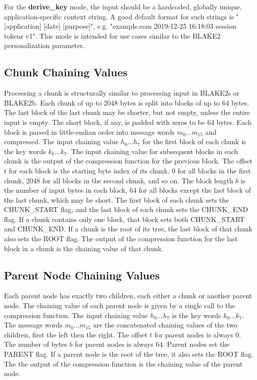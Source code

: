 \documentclass[11pt,notitlepage,a4paper]{article}
\begin{document}
For the \textbf{derive\_key} mode, the input should be a hardcoded, globally
unique, application-specific context string. A good default format for such
strings is "[application] [date] [purpose]", e.g. "example.com 2019-12-25
16:18:03 session tokens v1". This mode is intended for use cases similar to the
BLAKE2 personalization parameter.

\subsection{Chunk Chaining Values}\label{sec:chunk}

Processing a chunk is structurally similar to processing input in BLAKE2s or
BLAKE2b. Each chunk of up to 2048 bytes is split into blocks of up to 64 bytes.
The last block of the last chunk may be shorter, but not empty, unless the
entire input is empty. The short block, if any, is padded with zeros to be 64
bytes. Each block is parsed in little-endian order into message words $m_{0}
\ldots m_{15}$ and compressed. The input chaining value $h_{0} \ldots h_{7}$
for the first block of each chunk is the key words $k_{0} \ldots k_{7}$. The
input chaining value for subsequent blocks in each chunk is the output of the
compression function for the previous block. The offset $t$ for each block is
the starting byte index of its chunk, 0 for all blocks in the first chunk, 2048
for all blocks in the second chunk, and so on. The block length $b$ is the
number of input bytes in each block, 64 for all blocks except the last block of
the last chunk, which may be short. The first block of each chunk sets the
CHUNK\_START flag, and the last block of each chunk sets the CHUNK\_END flag.
If a chunk contains only one block, that block sets both CHUNK\_START and
CHUNK\_END. If a chunk is the root of its tree, the last block of that chunk
also sets the ROOT flag. The output of the compression function for the last
block in a chunk is the chaining value of that chunk.

\subsection{Parent Node Chaining Values}\label{sec:parent}

Each parent node has exactly two children, each either a chunk or another
parent node. The chaining value of each parent node is given by a single call
to the compression function. The input chaining value $h_{0} \ldots h_{7}$ is
the key words $k_{0} \ldots k_{7}$. The message words $m_{0} \ldots m_{15}$ are
the concatenated chaining values of the two children, first the left then the
right. The offset $t$ for parent nodes is always 0. The number of bytes $b$ for
parent nodes is always 64. Parent nodes set the PARENT flag. If a parent node
is the root of the tree, it also sets the ROOT flag. The the output of the
compression function is the chaining value of the parent node.
\end{document}
